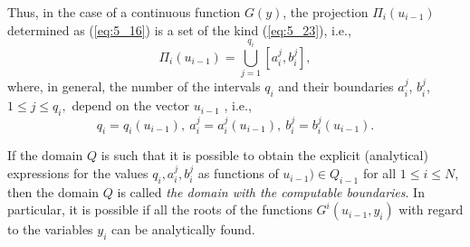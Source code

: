 Thus, in the case of a continuous function $G(y)$, the projection $\Pi_i(u_{i-1})$ determined as  (\ref{eq:5_16}) is a set of the kind (\ref{eq:5_23}), i.e.,
\begin{equation}
\label{eq:5_24}
\Pi_i(u_{i-1})=\bigcup_{j=1}^{q_i}{[a_i^j,b_i^j]},
\end{equation}
where, in general, the number of the intervals $q_i$  and their boundaries $a_i^j$, $b_i^j$, $1\leq j\leq q_i,$ depend on the vector $u_{i-1}$ , i.e.,
\begin{equation}
\label{eq:5_25}
q_i=q_i(u_{i-1}),\:a_i^j=a_i^j(u_{i-1}),\:b_i^j=b_i^j(u_{i-1}).
\end{equation}

If the domain $Q$  is such that it is possible to obtain the explicit (analytical) expressions for the values $q_i,a_i^j,b_i^j$   as  functions of $u_{i-1})\in Q_{i-1}$  for all $1\leq i\leq N$, then the domain $Q$ is called \textit{the domain with the computable boundaries}. In particular, it is possible if all the roots of the functions $G^i(u_{i-1},y_i)$  with regard to the variables $y_i$  can be analytically found.

